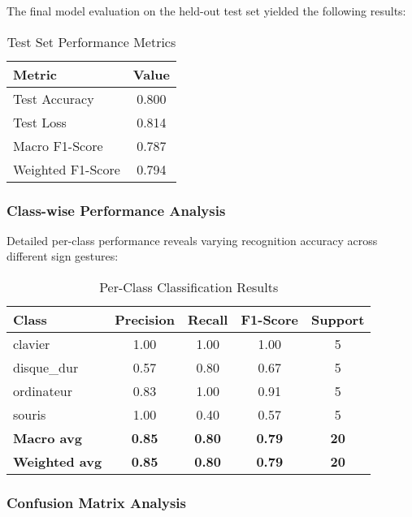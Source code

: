 \documentclass[11pt, a4paper]{article}
\begin{document}
The final model evaluation on the held-out test set yielded the following results:

\begin{table}[H]
    \centering
    \caption{Test Set Performance Metrics}
    \label{tab:test_results}
    \begin{tabular}{@{}lc@{}}
        \toprule
        \textbf{Metric} & \textbf{Value} \\ \midrule
        Test Accuracy & 0.800 \\
        Test Loss & 0.814 \\
        Macro F1-Score & 0.787 \\
        Weighted F1-Score & 0.794 \\ \bottomrule
    \end{tabular}
\end{table}

\subsubsection{Class-wise Performance Analysis}

Detailed per-class performance reveals varying recognition accuracy across different sign gestures:

\begin{table}[H]
    \centering
    \caption{Per-Class Classification Results}
    \label{tab:class_results}
    \begin{tabular}{@{}lcccc@{}}
        \toprule
        \textbf{Class} & \textbf{Precision} & \textbf{Recall} & \textbf{F1-Score} & \textbf{Support} \\ \midrule
        clavier & 1.00 & 1.00 & 1.00 & 5 \\
        disque\_dur & 0.57 & 0.80 & 0.67 & 5 \\
        ordinateur & 0.83 & 1.00 & 0.91 & 5 \\
        souris & 1.00 & 0.40 & 0.57 & 5 \\ \midrule
        \textbf{Macro avg} & \textbf{0.85} & \textbf{0.80} & \textbf{0.79} & \textbf{20} \\
        \textbf{Weighted avg} & \textbf{0.85} & \textbf{0.80} & \textbf{0.79} & \textbf{20} \\ \bottomrule
    \end{tabular}
\end{table}

\subsubsection{Confusion Matrix Analysis}
\end{document}
